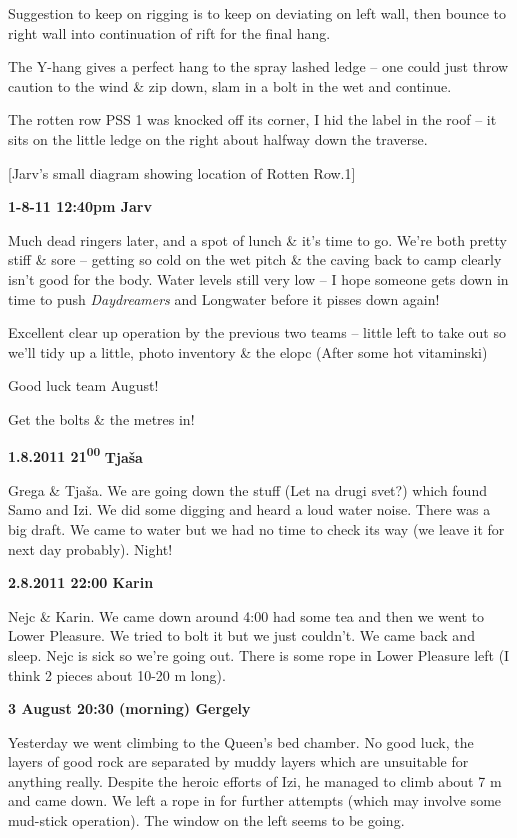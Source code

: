 Suggestion to keep on rigging is to keep on deviating on left wall, then
bounce to right wall into continuation of rift for the final hang.

The Y-hang gives a perfect hang to the spray lashed ledge -- one could
just throw caution to the wind \& zip down, slam in a bolt in the wet
and continue.

The rotten row PSS 1 was knocked off its corner, I hid the label in the
roof -- it sits on the little ledge on the right about halfway down the
traverse.

{[}Jarv's small diagram showing location of Rotten Row.1{]}

\textbf{1-8-11 12:40pm Jarv}

Much dead ringers later, and a spot of lunch \& it's time to go. We're
both pretty stiff \& sore -- getting so cold on the wet pitch \& the
caving back to camp clearly isn't good for the body. Water levels still
very low -- I hope someone gets down in time to push \emph{Daydreamers}
and Longwater before it pisses down again!

Excellent clear up operation by the previous two teams -- little left to
take out so we'll tidy up a little, photo inventory \& the elopc (After
some hot vitaminski)

Good luck team August!

Get the bolts \& the metres in!

\textbf{1.8.2011 21\textsuperscript{00}} \textbf{Tjaša}

Grega \& Tjaša. We are going down the stuff (Let na drugi svet?) which
found Samo and Izi. We did some digging and heard a loud water noise.
There was a big draft. We came to water but we had no time to check its
way (we leave it for next day probably). Night!

\textbf{2.8.2011 22:00 Karin}

Nejc \& Karin. We came down around 4:00 had some tea and then we went to
Lower Pleasure. We tried to bolt it but we just couldn't. We came back
and sleep. Nejc is sick so we're going out. There is some rope in Lower
Pleasure left (I think 2 pieces about 10-20 m long).

\textbf{3 August 20:30 (morning) Gergely}

Yesterday we went climbing to the Queen's bed chamber. No good luck, the
layers of good rock are separated by muddy layers which are unsuitable
for anything really. Despite the heroic efforts of Izi, he managed to
climb about 7 m and came down. We left a rope in for further attempts
(which may involve some mud-stick operation). The window on the left
seems to be going.

